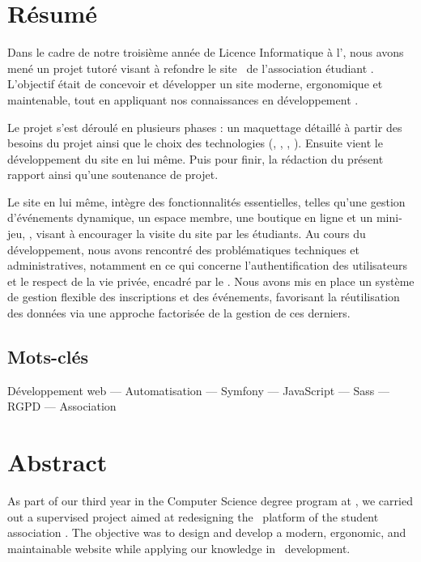 \chapter*{Résumé}
\label{chap:abstract-fr}

Dans le cadre de notre troisième année de Licence Informatique à l’\univ, nous avons mené un projet tutoré visant à refondre le site \web\ de l’association étudiant . L’objectif était de concevoir et développer un site moderne, ergonomique et maintenable, tout en appliquant nos connaissances en développement \web.

Le projet s’est déroulé en plusieurs phases : un maquettage détaillé à partir des besoins du projet ainsi que le choix des technologies (, , , ). Ensuite vient le développement du site en lui même. Puis pour finir, la rédaction du présent rapport ainsi qu'une soutenance de projet.

Le site en lui même, intègre des fonctionnalités essentielles, telles qu’une gestion d’événements dynamique, un espace membre, une boutique en ligne et un mini-jeu, \game, visant à encourager la visite du site par les étudiants. Au cours du développement, nous avons rencontré des problématiques techniques et administratives, notamment en ce qui concerne l’authentification des utilisateurs et le respect de la vie privée, encadré par le . Nous avons mis en place un système de gestion flexible des inscriptions et des événements, favorisant la réutilisation des données via une approche factorisée de la gestion de ces derniers.

\section*{Mots-clés}

\noindent Développement web --- Automatisation --- Symfony --- JavaScript --- Sass --- RGPD --- Association

\pagebreak

\chapter*{Abstract}
\label{chap:abstract-en}

As part of our third year in the Computer Science degree program at \univ, we carried out a supervised project aimed at redesigning the \web\ platform of the student association . The objective was to design and develop a modern, ergonomic, and maintainable website while applying our knowledge in \web\ development.


